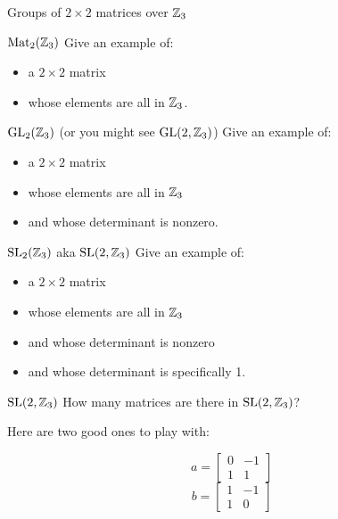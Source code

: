 \documentclass[8pt, handout]{beamer}
\begin{document}
\begin{frame}{Groups of $2\times 2$ matrices over $\mathbb{Z}_3$} \pause

  \begin{exampleblock}{$\operatorname{Mat}_2(\mathbb{Z}_3)$}
    Give an example of:
    \begin{itemize}
      \item a $2\times 2$ matrix 
      \item whose elements are all in $\mathbb{Z}_3$.
    \end{itemize} 
    
  \end{exampleblock} \pause

  \begin{exampleblock}{$\operatorname{GL}_2(\mathbb{Z}_3)$ (or you might see $\operatorname{GL}(2, \mathbb{Z}_3)$)}
    Give an example of:
    \begin{itemize}
      \item a $2\times 2$ matrix 
      \item whose elements are all in $\mathbb{Z}_3$ \pause
      \item and whose determinant is nonzero.
    \end{itemize} 
  \end{exampleblock} \pause

  \begin{exampleblock}{$\operatorname{SL}_2(\mathbb{Z}_3)$ aka $\operatorname{SL}(2, \mathbb{Z}_3)$}
    Give an example of:
    \begin{itemize}
      \item a $2\times 2$ matrix 
      \item whose elements are all in $\mathbb{Z}_3$
      \item and whose determinant is nonzero \pause
      \item and whose determinant is specifically 1.
    \end{itemize} 
  \end{exampleblock}
  
\end{frame}


\begin{frame}{$\operatorname{SL}(2, \mathbb{Z}_3)$}
  How many matrices are there in $\operatorname{SL}(2, \mathbb{Z}_3)$? 

  \medskip \pause

  Here are two good ones to play with:

  \[a = \begin{bmatrix}0 & -1 \\ 1 & 1\end{bmatrix}\]
  \[b = \begin{bmatrix}1& -1 \\ 1 & 0\end{bmatrix}\]
\end{frame}
\end{document}
